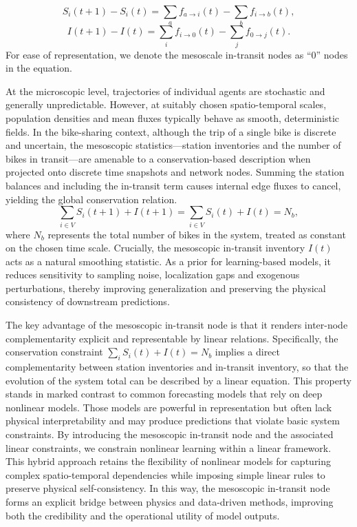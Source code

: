 \documentclass[preprint,12pt,authoryear]{elsarticle}
\begin{document}
\begin{equation}
S_i(t+1)-S_i(t)=\sum_{a} f_{a\to i}(t) - \sum_{b} f_{i\to b}(t),
\end{equation}
\begin{equation}
I(t+1)-I(t)=\sum_{i} f_{i\to 0}(t) - \sum_{j} f_{0\to j}(t).
\end{equation}
For ease of representation, we denote the mesoscale in-transit nodes as ``0'' nodes in the equation. 

At the microscopic level, trajectories of individual agents are stochastic and generally unpredictable. However, at suitably chosen spatio-temporal scales, population densities and mean fluxes typically behave as smooth, deterministic fields. In the bike-sharing context, although the trip of a single bike is discrete and uncertain, the mesoscopic statistics—station inventories and the number of bikes in transit—are amenable to a conservation-based description when projected onto discrete time snapshots and network nodes. Summing the station balances and including the in-transit term causes internal edge fluxes to cancel, yielding the global conservation relation.
\begin{equation}
\sum_{i\in V} S_i(t+1) + I(t+1) = \sum_{i\in V} S_i(t) + I(t) = N_b,
\end{equation}
where $N_b$ represents the total number of bikes in the system, treated as constant on the chosen time scale. Crucially, the mesoscopic in-transit inventory $I(t)$ acts as a natural smoothing statistic. As a prior for learning-based models, it reduces sensitivity to sampling noise, localization gaps and exogenous perturbations, thereby improving generalization and preserving the physical consistency of downstream predictions.

The key advantage of the mesoscopic in-transit node is that it renders inter-node complementarity explicit and representable by linear relations. Specifically, the conservation constraint $\sum_{i} S_i(t) + I(t) = N_b$ implies a direct complementarity between station inventories and in-transit inventory, so that the evolution of the system total can be described by a linear equation. This property stands in marked contrast to common forecasting models that rely on deep nonlinear models. Those models are powerful in representation but often lack physical interpretability and may produce predictions that violate basic system constraints. By introducing the mesoscopic in-transit node and the associated linear constraints, we constrain nonlinear learning within a linear framework. This hybrid approach retains the flexibility of nonlinear models for capturing complex spatio-temporal dependencies while imposing simple linear rules to preserve physical self-consistency. In this way, the mesoscopic in-transit node forms an explicit bridge between physics and data-driven methods, improving both the credibility and the operational utility of model outputs.
\end{document}
